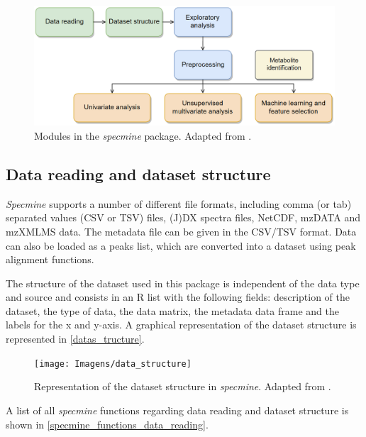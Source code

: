 \begin{figure}[!htb]
	\centering
	\includegraphics[width=0.85\linewidth]{Imagens/specmine}
	\caption{Modules in the \textit{specmine} package. Adapted from \cite{costa2016r}.}
	\label{specmine}
\end{figure}

\subsection{Data reading and dataset structure}

\textit{Specmine} supports a number of different file formats, including comma (or tab) separated values (CSV or TSV) files, (J)DX spectra files, NetCDF, mzDATA and mzXMLMS data. The metadata file can be given in the CSV/TSV format. Data can also be loaded as a peaks list, which are converted into a dataset using peak alignment functions. 

The structure of the dataset used in this package is independent of the data type and source and consists in an R list with the following fields: description of the dataset, the type of data, the data matrix, the metadata data frame and the labels for the x and y-axis. A graphical representation of the dataset structure is represented in \autoref{datas_tructure}.


\begin{figure}[!htb]
	\centering
	\texttt{[image: Imagens/data\_structure]}
	\caption{Representation of the dataset structure in \textit{specmine}. Adapted from \cite{costa2016r}.}
	\label{datas_tructure}
\end{figure}

A list of all \textit{specmine} functions regarding data reading and dataset structure is shown in \autoref{specmine_functions_data_reading}.

